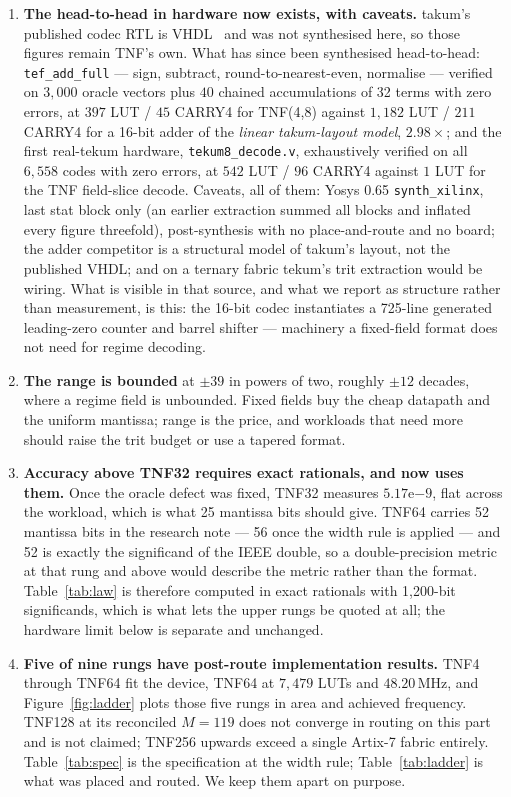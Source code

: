 \documentclass[11pt]{article}
\theoremstyle{definition}
\begin{document}
\begin{enumerate}[leftmargin=*]
\item \textbf{The head-to-head in hardware now exists, with caveats.} takum's
published codec RTL is VHDL~\cite{takumrtl} and was not synthesised here, so
those figures remain TNF's own. What has since been synthesised head-to-head:
\texttt{tef\_add\_full} --- sign, subtract, round-to-nearest-even, normalise
--- verified on $3{,}000$ oracle vectors plus $40$ chained accumulations of 32
terms with zero errors, at $397$ LUT / $45$ CARRY4 for TNF(4,8) against
$1{,}182$ LUT / $211$ CARRY4 for a 16-bit adder of the \emph{linear
takum-layout model}, $2.98\times$; and the first real-tekum hardware,
\texttt{tekum8\_decode.v}, exhaustively verified on all $6{,}558$ codes with
zero errors, at $542$ LUT / $96$ CARRY4 against $1$ LUT for the TNF
field-slice decode. Caveats, all of them: Yosys 0.65 \texttt{synth\_xilinx},
last stat block only (an earlier extraction summed all blocks and inflated
every figure threefold), post-synthesis with no place-and-route and no board;
the adder competitor is a structural model of takum's layout, not the
published VHDL; and on a ternary fabric tekum's trit extraction would be
wiring. What is visible in that source, and what we report as structure
rather than measurement, is this: the 16-bit codec instantiates a 725-line
generated leading-zero counter and barrel shifter --- machinery a fixed-field
format does not need for regime decoding.

\item \textbf{The range is bounded} at $\pm39$ in powers of two, roughly $\pm12$
decades, where a regime field is unbounded. Fixed fields buy the cheap datapath
and the uniform mantissa; range is the price, and workloads that need more should
raise the trit budget or use a tapered format.

\item \textbf{Accuracy above TNF32 requires exact rationals, and now uses them.}
Once the oracle defect was fixed, TNF32 measures $5.17\mathrm{e}{-9}$, flat
across the workload, which is what 25 mantissa bits should give. TNF64 carries
52 mantissa bits in the research note --- 56 once the width rule is applied ---
and 52 is exactly the significand of the IEEE double, so a double-precision
metric at that rung and above would describe the metric rather than the format.
Table~\ref{tab:law} is therefore computed in exact rationals with 1{,}200-bit
significands, which is what lets the upper rungs be quoted at all; the hardware
limit below is separate and unchanged.

\item \textbf{Five of nine rungs have post-route implementation results.} TNF4 through TNF64 fit
the device, TNF64 at $7{,}479$ LUTs and $48.20$\,MHz, and Figure~\ref{fig:ladder}
plots those five rungs in area and achieved frequency. TNF128 at its reconciled
$M = 119$ does not
converge in routing on this part and is not claimed; TNF256 upwards exceed a
single Artix-7 fabric entirely. Table~\ref{tab:spec} is the specification at the
width rule; Table~\ref{tab:ladder} is what was placed and routed. We keep them
apart on purpose.


\end{enumerate}
\end{document}
